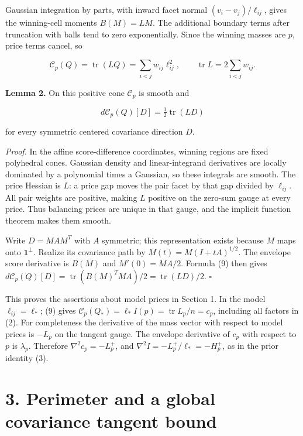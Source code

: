 \documentclass[
  11pt,
]{article}
\begin{document}
Gaussian integration by parts, with inward facet normal
\((v_i-v_j)/\ell_{ij}\), gives the winning-cell moments \(B(M)=LM\). The
additional boundary terms after truncation with balls tend to zero
exponentially. Since the winning masses are \(p\), price terms cancel,
so

\[
 \mathcal C_p(Q)=\operatorname{tr}(LQ)=\sum_{i<j}w_{ij}\ell_{ij}^2,
                 \qquad\operatorname{tr}L=2\sum_{i<j}w_{ij}.      \tag{9}
\]

\textbf{Lemma 2.} On this positive cone \(\mathcal C_p\) is smooth and

\[
                 d\mathcal C_p(Q)[D]=\tfrac12\operatorname{tr}(LD)
                                                               \tag{10}
\]

for every symmetric centered covariance direction \(D\).

\emph{Proof.} In the affine score-difference coordinates, winning
regions are fixed polyhedral cones. Gaussian density and
linear-integrand derivatives are locally dominated by a polynomial times
a Gaussian, so these integrals are smooth. The price Hessian is \(L\): a
price gap moves the pair facet by that gap divided by \(\ell_{ij}\). All
pair weights are positive, making \(L\) positive on the zero-sum gauge
at every price. Thus balancing prices are unique in that gauge, and the
implicit function theorem makes them smooth.

Write \(D=MAM^T\) with \(A\) symmetric; this representation exists
because \(M\) maps onto \(\mathbf1^\perp\). Realize its covariance path
by \(M(t)=M(I+tA)^{1/2}\). The envelope score derivative is \(B(M)\) and
\(M'(0)=MA/2\). Formula (9) then gives
\(d\mathcal C_p(Q)[D]=\operatorname{tr}(B(M)^TMA)/2
=\operatorname{tr}(LD)/2\). \(\square\)

This proves the assertions about model prices in Section 1. In the model
\(\ell_{ij}=\ell_*\); (9) gives
\(\mathcal C_p(Q_*)=\ell_*I(p)=\operatorname{tr}L_p/n=c_p\), including
all factors in (2). For completeness the derivative of the mass vector
with respect to model prices is \(-L_p\) on the tangent gauge. The
envelope derivative of \(c_p\) with respect to \(p\) is \(\lambda_p\).
Therefore \(\nabla^2 c_p=-L_p^+\), and
\(\nabla^2 I=-L_p^+/\ell_*=-H_p^+\), as in the prior identity (3).

\section{3. Perimeter and a global covariance tangent
bound}\label{perimeter-and-a-global-covariance-tangent-bound}
\end{document}

